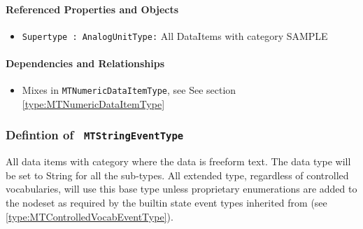 \FloatBarrier
\paragraph{Referenced Properties and Objects}

\begin{itemize}
\item \texttt{Supertype : AnalogUnitType:} All DataItems with category SAMPLE

\end{itemize}
\paragraph{Dependencies and Relationships}

\begin{itemize}
\item Mixes in \texttt{MTNumericDataItemType}, see See section \ref{type:MTNumericDataItemType}
\end{itemize}
\FloatBarrier
\subsubsection{Defintion of \texttt{ MTStringEventType}}
  \label{type:MTStringEventType}

\FloatBarrier

All data items with \gls{category}  where the data is freeform text. The data type
will be set to String for all the sub-types. All extended type, regardless of 
controlled vocabularies, will use this base type unless proprietary 
enumerations are added to the nodeset as required by the builtin state
event types inherited from  (see \ref{type:MTControlledVocabEventType}).

